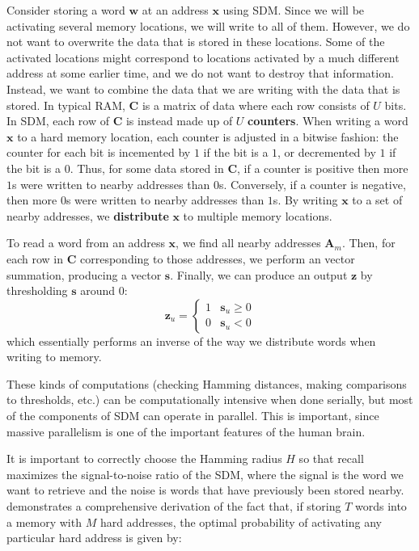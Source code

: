 \documentclass[journal, onecolumn, 12pt, draftclsnofoot]{IEEEtran}
\newcommand{\kword}[1]{\textbf{#1}}
\newcommand{\mbf}[1]{\mathbf{#1}}
\begin{document}
	\par Consider storing a word $\mbf{w}$ at an address $\mbf{x}$ using SDM. Since we will be activating several memory locations, we will write to all of them. However, we do not want to overwrite the data that is stored in these locations. Some of the activated locations might correspond to locations activated by a much different address at some earlier time, and we do not want to destroy that information. Instead, we want to combine the data that we are writing with the data that is stored.
	In typical RAM, $\mbf{C}$ is a matrix of data where each row consists of $U$ bits. In SDM, each row of $\mbf{C}$ is instead made up of $U$ \kword{counters}. When writing a word $\mbf{x}$ to a hard memory location, each counter is adjusted in a bitwise fashion: the counter for each bit is incemented by $1$ if the bit is a $1$, or decremented by $1$ if the bit is a $0$.
	Thus, for some data stored in $\mbf{C}$, if a counter is positive then more $1$s were written to nearby addresses than $0$s. Conversely, if a counter is negative, then more $0$s were written to nearby addresses than $1$s. By writing $\mbf{x}$ to a set of nearby addresses, we \kword{distribute} $\mbf{x}$ to multiple memory locations.
	\par To read a word from an address $\mbf{x}$, we find all nearby addresses $\mbf{A}_m$. Then, for each row in $\mbf{C}$ corresponding to those addresses, we perform an vector summation, producing a vector $\mbf{s}$. Finally, we can produce an output $\mbf{z}$ by thresholding $\mbf{s}$ around $0$:
	\begin{equation}
		\mbf{z}_u = \begin{cases}
								1 & \mbf{s}_u \geq 0 \\
								0 & \mbf{s}_u < 0
								\end{cases}
	\end{equation}
	which essentially performs an inverse of the way we distribute words when writing to memory.
	\par These kinds of computations (checking Hamming distances, making comparisons to thresholds, etc.) can be computationally intensive when done serially, but most of the components of SDM can operate in parallel. This is important, since massive parallelism is one of the important features of the human brain.
	\par It is important to correctly choose the Hamming radius $H$ so that recall maximizes the signal-to-noise ratio of the SDM, where the signal is the word we want to retrieve and the noise is words that have previously been stored nearby. \cite{sdm} demonstrates a comprehensive derivation of the fact that, if storing $T$ words into a memory with $M$ hard addresses, the optimal probability of activating any particular hard address is given by:
\end{document}
